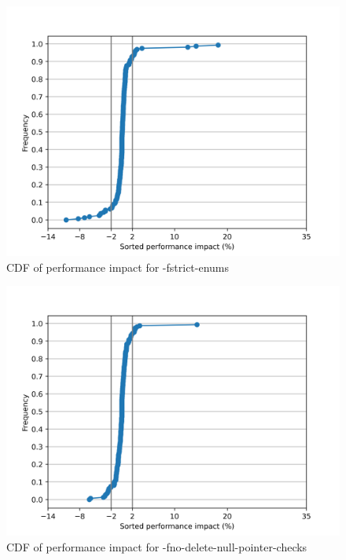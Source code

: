 \begin{figure}
\centering
\includegraphics{fstrict-enums}
\caption{CDF of performance impact for -fstrict-enums}
\end{figure}

\begin{figure}
\centering
\includegraphics{fno-delete-null-pointer-checks}
\caption{CDF of performance impact for -fno-delete-null-pointer-checks}
\end{figure}


